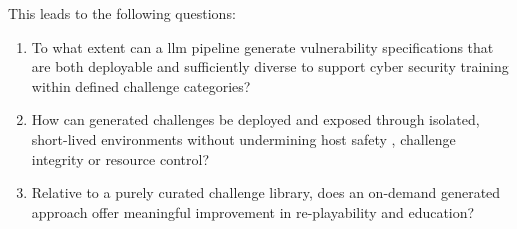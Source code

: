 This leads to the following questions:
\begin{enumerate}
    \item To what extent can a \gls{llm} pipeline generate vulnerability specifications that are both deployable and sufficiently diverse to support cyber security training within defined challenge categories?
    \item How can generated challenges be deployed and exposed through isolated, short-lived environments without undermining host safety , challenge integrity or resource control?
    \item Relative to a purely curated challenge library, does an on-demand generated approach offer meaningful improvement in re-playability and education?
\end{enumerate}
